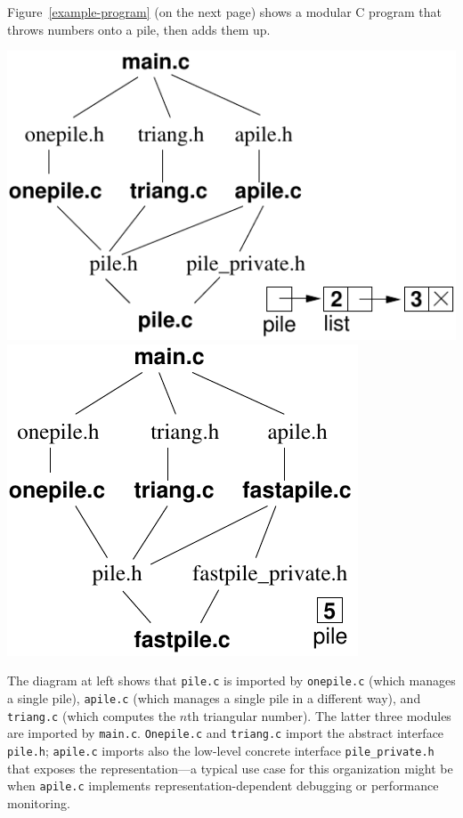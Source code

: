 \documentclass[runningheads,orivec]{llncs}
\begin{document}
Figure~\ref{example-program} (on the next page) shows a modular C
program that throws numbers onto a pile, then adds them up.\newline
\centerline{\includegraphics[scale=.7]{graphics/graph.pdf}\hspace{.5in}\includegraphics[scale=.7]{graphics/graph2.pdf}}
\noindent The diagram at left shows that \lstinline{pile.c} is
imported by \lstinline{onepile.c} (which manages a single pile),
\lstinline{apile.c} (which manages a single pile in a different way),
and \lstinline{triang.c} (which computes the $n$th triangular number).
The latter three modules are imported by \lstinline{main.c}.
\lstinline{Onepile.c} and \lstinline{triang.c} import the abstract
interface \lstinline{pile.h}; \lstinline{apile.c} imports also
the low-level concrete interface \lstinline{pile_private.h} that
exposes the representation---a typical use case for this organization
might be when \lstinline{apile.c} implements representation-dependent
debugging or performance monitoring.
\end{document}
